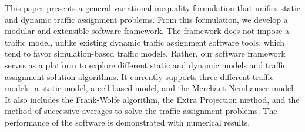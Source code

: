This paper presents a general variational inequality formulation that unifies static and dynamic traffic assignment problems. From this formulation, we develop a modular and extensible software framework. The framework does not impose a traffic model, unlike existing dynamic traffic assignment software tools, which tend to favor simulation-based traffic models. Rather, our software framework serves as a platform to explore different static and dynamic models and traffic assignment solution algorithms. It currently supports three different traffic models: a static model, a cell-based model, and the Merchant-Nemhauser model. It also includes the Frank-Wolfe algorithm, the Extra Projection method, and the method of successive averages to solve the traffic assignment problems. The performance of the software is demonstrated with numerical results. 